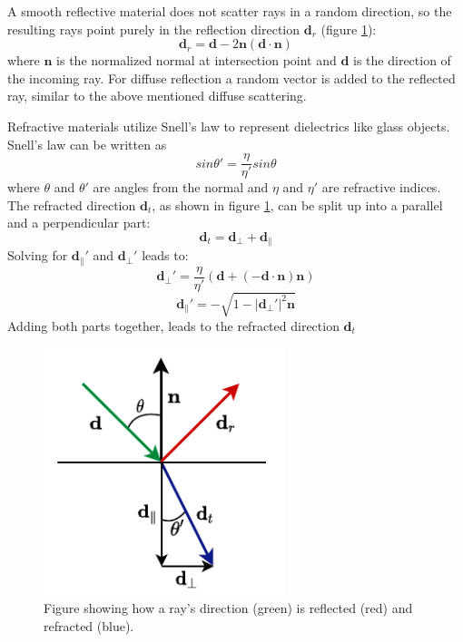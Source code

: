 A smooth reflective material\cite{Greve2004ReflectionsAR} does not scatter rays in a random direction, so the resulting rays point purely in the reflection direction $\textbf{d}_r$ (figure \ref{fig:reflect_refract}):
\[
    \textbf{d}_r = \textbf{d} - 2\textbf{n}(\textbf{d}\cdot \textbf{n})
\]
where $\textbf{n}$ is the normalized normal at intersection point and $\textbf{d}$ is the direction of the incoming ray. For diffuse reflection a random vector is added to the reflected ray, similar to the above mentioned diffuse scattering.

Refractive materials\cite{Greve2004ReflectionsAR} utilize Snell's law to represent dielectrics like glass objects. Snell's law can be written as 
\[
    sin \theta' = \frac{\eta}{\eta'}sin \theta
\]
where $\theta$ and $\theta'$ are angles from the normal and $\eta$ and $\eta'$ are refractive indices. The refracted direction $\textbf{d}_t$, as shown in figure \ref{fig:reflect_refract}, can be split up into a parallel and a perpendicular part:
\[
    \textbf{d}_t=\textbf{d}_{\bot}+\textbf{d}_{\parallel}
\]
Solving for $\textbf{d}_{\parallel}'$ and $\textbf{d}_{\bot}'$ leads to:
\[
     \textbf{d}_{\bot}' = \frac{\eta}{\eta'}(\textbf{d}+(-\textbf{d}\cdot\textbf{n}) \textbf{n})
\]
\[
    \textbf{d}_{\parallel}' = - \sqrt{1-|\textbf{d}_{\bot}'|^{2}\textbf{n}}
\]
Adding both parts together, leads to the refracted direction $\textbf{d}_t$
\begin{figure}[H]
    \centering
    \includegraphics[width=200pt]{images/reflection_refraction.pdf}
    \caption{Figure showing how a ray's direction (green) is reflected (red) and refracted (blue).}
    \label{fig:reflect_refract}
\end{figure}
